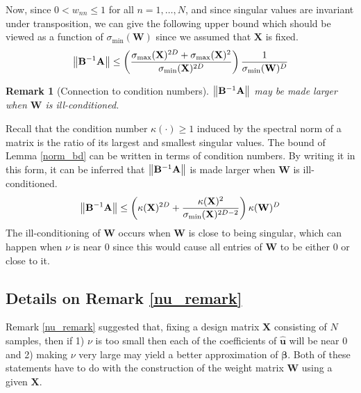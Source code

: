 \documentclass[12pt]{article}  %
\newcommand{\bu}{\mathbf{u}}
\newcommand{\bA}{\mathbf{A}}
\newcommand{\bB}{\mathbf{B}}
\newcommand{\bX}{\mathbf{X}}
\newcommand{\bW}{\mathbf{W}}
\newtheorem{remark2}[thm]{Remark}
\begin{document}
    Now, since $0<w_{nn}\leq 1$ for all $n=1,\ldots,N$, and since singular values are invariant under transposition, we can give the following upper bound which should be viewed as a function of $\sigma_{\min}(\bW)$ since we assumed that $\bX$ is fixed. 
    \begin{equation*}
        \norm{\bB^{-1}\bA} \leq \left(\frac{\sigma_{\max}(\bX)^{2D} + \sigma_{\max}(\bX)^2}{\sigma_{\min}(\bX)^{2D}}\right) \frac{1}{\sigma_{\min}(\bW)^D}
    \end{equation*}

\begin{remark2}[Connection to condition numbers]
    \label{condition_number_remark}
    $\norm{\bB^{-1}\bA}$ may be made larger when $\bW$ is ill-conditioned.
\end{remark2}
        Recall that the condition number $\kappa(\cdot)\geq 1$ induced by the spectral norm of a matrix is the ratio of its largest and smallest singular values. The bound of Lemma \ref{norm_bd} can be written in terms of condition numbers. By writing it in this form, it can be inferred that $\norm{\bB^{-1}\bA}$ is made larger when $\bW$ is ill-conditioned. 
    \begin{equation*}
        \norm{\bB^{-1}\bA} \leq \left(\kappa(\bX)^{2D} + \frac{\kappa(\bX)^2}{\sigma_{\min}(\bX)^{2D-2}}\right) \kappa(\bW)^D 
    \end{equation*}
    The ill-conditioning of $\bW$ occurs when $\bW$ is close to being singular, which can happen when $\nu$ is near $0$ since this would cause all entries of $\bW$ to be either 0 or close to it. 


    \subsection{Details on Remark \ref{nu_remark}}
                Remark \ref{nu_remark} suggested that, fixing a design matrix $\bX$ consisting of $N$ samples, then if 1) $\nu$ is too small then each of the coefficients of $\hat{\bu}$ will be near $0$ and 2) making $\nu$ very large may yield a better  approximation of $\boldsymbol{\beta}$. Both of these statements have to do with the construction of the weight matrix $\bW$ using a given $\bX$. 
\end{document}
